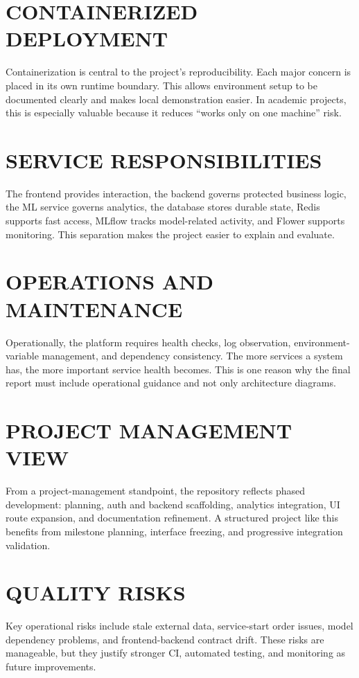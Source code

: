 \documentclass[12pt,a4paper]{report}
\begin{document}
\section{CONTAINERIZED DEPLOYMENT}
Containerization is central to the project's reproducibility. Each major concern is placed in its own runtime boundary. This allows environment setup to be documented clearly and makes local demonstration easier. In academic projects, this is especially valuable because it reduces ``works only on one machine'' risk.

\section{SERVICE RESPONSIBILITIES}
The frontend provides interaction, the backend governs protected business logic, the ML service governs analytics, the database stores durable state, Redis supports fast access, MLflow tracks model-related activity, and Flower supports monitoring. This separation makes the project easier to explain and evaluate.

\section{OPERATIONS AND MAINTENANCE}
Operationally, the platform requires health checks, log observation, environment-variable management, and dependency consistency. The more services a system has, the more important service health becomes. This is one reason why the final report must include operational guidance and not only architecture diagrams.

\section{PROJECT MANAGEMENT VIEW}
From a project-management standpoint, the repository reflects phased development: planning, auth and backend scaffolding, analytics integration, UI route expansion, and documentation refinement. A structured project like this benefits from milestone planning, interface freezing, and progressive integration validation.

\section{QUALITY RISKS}
Key operational risks include stale external data, service-start order issues, model dependency problems, and frontend-backend contract drift. These risks are manageable, but they justify stronger CI, automated testing, and monitoring as future improvements.
\end{document}
